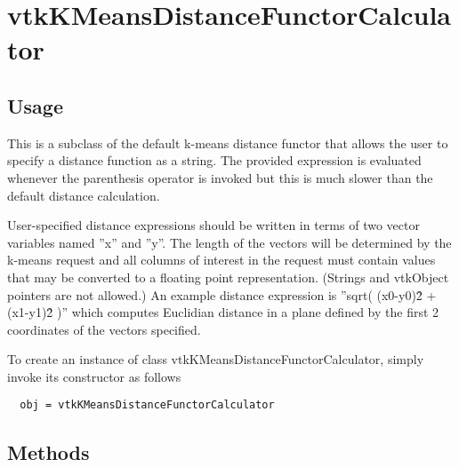 \section{vtkKMeansDistanceFunctorCalculator}

\subsection{Usage}

 This is a subclass of the default k-means distance functor that allows
 the user to specify a distance function as a string. The provided
 expression is evaluated whenever the parenthesis operator is invoked
 but this is much slower than the default distance calculation.

 User-specified distance expressions should be written in terms of
 two vector variables named ''x'' and ''y''.
 The length of the vectors will be determined by the k-means request
 and all columns of interest in the request must contain values that
 may be converted to a floating point representation. (Strings and
 vtkObject pointers are not allowed.)
 An example distance expression is ''sqrt( (x0-y0)\^2 + (x1-y1)\^2 )''
 which computes Euclidian distance in a plane defined by the first
 2 coordinates of the vectors specified.

To create an instance of class vtkKMeansDistanceFunctorCalculator, simply
invoke its constructor as follows
\begin{verbatim}
  obj = vtkKMeansDistanceFunctorCalculator
\end{verbatim}
\subsection{Methods}

